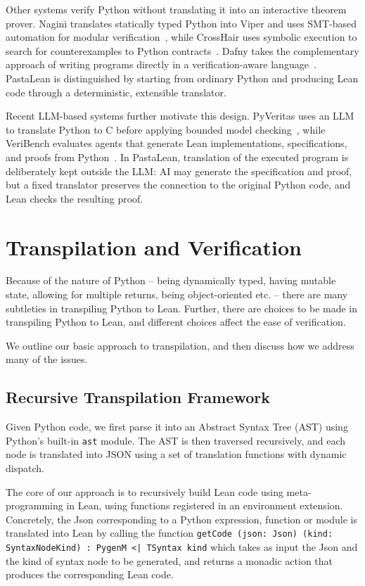 \documentclass{article}
\newcommand{\code}{\lstinline}
\begin{document}
Other systems verify Python without translating it into an interactive theorem prover. Nagini translates statically typed Python into Viper and uses SMT-based automation for modular verification~\cite{nagini}, while CrossHair uses symbolic execution to search for counterexamples to Python contracts~\cite{crosshair}. Dafny takes the complementary approach of writing programs directly in a verification-aware language~\cite{dafny}. PastaLean is distinguished by starting from ordinary Python and producing Lean code through a deterministic, extensible translator.

Recent LLM-based systems further motivate this design. PyVeritas uses an LLM to translate Python to C before applying bounded model checking~\cite{pyveritas}, while VeriBench evaluates agents that generate Lean implementations, specifications, and proofs from Python~\cite{veribench}. In PastaLean, translation of the executed program is deliberately kept outside the LLM: AI may generate the specification and proof, but a fixed translator preserves the connection to the original Python code, and Lean checks the resulting proof.
\section{Transpilation and Verification}

Because of the nature of Python -- being dynamically typed, having mutable state, allowing for multiple returns, being object-oriented etc. -- there are many subtleties in transpiling Python to Lean. Further, there are choices to be made in transpiling Python to Lean, and different choices affect the ease of verification.

We outline our basic approach to transpilation, and then discuss how we address many of the issues.

\subsection{Recursive Transpilation Framework}

Given Python code, we first parse it into an Abstract Syntax Tree (AST) using Python's built-in \code{ast} module. The AST is then traversed recursively, and each node is translated into JSON using a set of translation functions with dynamic dispatch.

The core of our approach is to recursively build Lean code using meta-programming in Lean, using functions registered in an environment extension. Concretely, the Json corresponding to a Python expression, function or module is translated into Lean by calling the function \code{getCode (json: Json) (kind: SyntaxNodeKind) : PygenM <| TSyntax kind} which takes as input the Json and the kind of syntax node to be generated, and returns a monadic action that produces the corresponding Lean code. 
\end{document}
